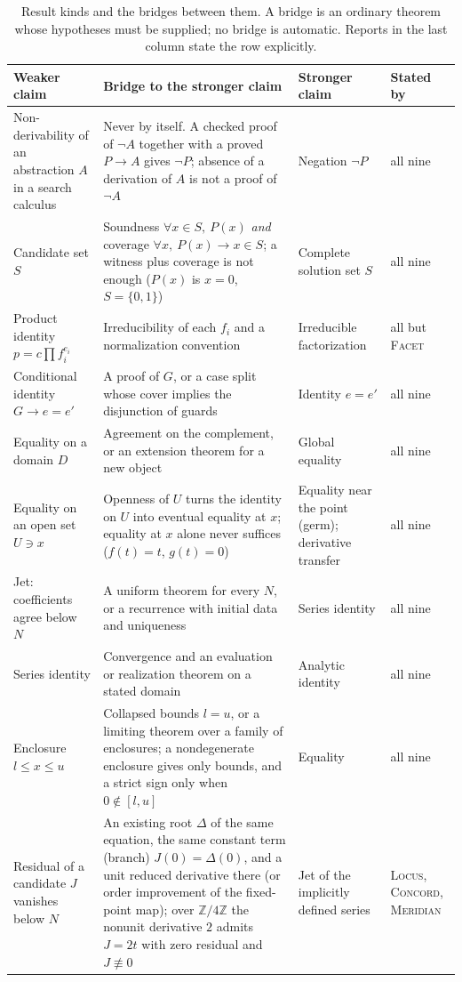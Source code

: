 \documentclass[11pt,a4paper]{article}
\newcommand{\Lc}{\textsc{Locus}}
\newcommand{\Cc}{\textsc{Concord}}
\newcommand{\Fc}{\textsc{Facet}}
\newcommand{\Md}{\textsc{Meridian}}
\newcommand{\Z}{\mathbb Z}
\theoremstyle{definition}
\begin{document}
\begin{table}[htbp]
\centering\small
\caption{Result kinds and the bridges between them. A bridge is an ordinary theorem whose hypotheses must be supplied; no bridge is automatic. Reports in the last column state the row explicitly.}
\label{tab:promotion}
\begin{tabularx}{\textwidth}{@{}L{31mm}YL{40mm}L{22mm}@{}}
\toprule
Weaker claim & Bridge to the stronger claim & Stronger claim & Stated by\\
\midrule
Non-derivability of an abstraction $A$ in a search calculus & Never by itself. A checked proof of $\neg A$ together with a proved $P\to A$ gives $\neg P$; absence of a derivation of $A$ is not a proof of $\neg A$ & Negation $\neg P$ & all nine\\
Candidate set $S$ & Soundness $\forall x\in S,\ P(x)$ \emph{and} coverage $\forall x,\ P(x)\to x\in S$; a witness plus coverage is not enough ($P(x)$ is $x=0$, $S=\{0,1\}$) & Complete solution set $S$ & all nine\\
Product identity $p=c\prod f_i^{e_i}$ & Irreducibility of each $f_i$ and a normalization convention & Irreducible factorization & all but \Fc\\
Conditional identity $G\to e=e'$ & A proof of $G$, or a case split whose cover implies the disjunction of guards & Identity $e=e'$ & all nine\\
Equality on a domain $D$ & Agreement on the complement, or an extension theorem for a new object & Global equality & all nine\\
Equality on an open set $U\ni x$ & Openness of $U$ turns the identity on $U$ into eventual equality at $x$; equality at $x$ alone never suffices ($f(t)=t$, $g(t)=0$) & Equality near the point (germ); derivative transfer & all nine\\
Jet: coefficients agree below $N$ & A uniform theorem for every $N$, or a recurrence with initial data and uniqueness & Series identity & all nine\\
Series identity & Convergence and an evaluation or realization theorem on a stated domain & Analytic identity & all nine\\
Enclosure $l\le x\le u$ & Collapsed bounds $l=u$, or a limiting theorem over a family of enclosures; a nondegenerate enclosure gives only bounds, and a strict sign only when $0\notin[l,u]$ & Equality & all nine\\
Residual of a candidate $J$ vanishes below $N$ & An existing root $\Delta$ of the same equation, the same constant term (branch) $J(0)=\Delta(0)$, and a unit reduced derivative there (or order improvement of the fixed-point map); over $\Z/4\Z$ the nonunit derivative $2$ admits $J=2t$ with zero residual and $J\not\equiv 0$ & Jet of the implicitly defined series & \Lc, \Cc, \Md\\

\end{tabularx}
\end{table}
\end{document}
